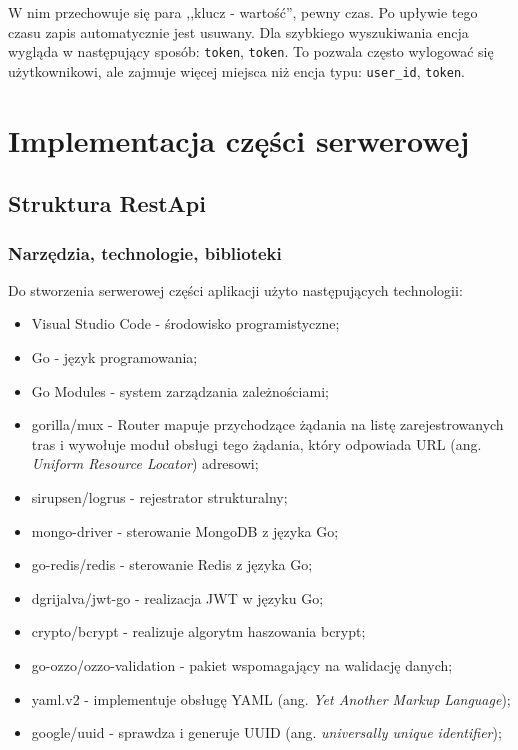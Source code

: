 W nim przechowuje się para ,,klucz - wartość'', pewny czas. Po upływie tego czasu zapis automatycznie jest usuwany.
Dla szybkiego wyszukiwania encja wygląda w następujący sposób: \texttt{token}, \texttt{token}. To pozwala często wylogować się użytkownikowi, ale zajmuje więcej miejsca niż encja typu: \texttt{user\_id}, \texttt{token}.

\section{Implementacja części serwerowej}
% 
\subsection{Struktura RestApi}
% 
\subsubsection{Narzędzia, technologie, biblioteki}
Do stworzenia serwerowej części aplikacji użyto następujących technologii:
\begin{itemize}
\item Visual Studio Code - środowisko programistyczne;
\item Go - język programowania;
\item Go Modules - system zarządzania zależnościami;
\item gorilla/mux - Router mapuje przychodzące żądania na listę zarejestrowanych tras i wywołuje moduł obsługi tego żądania, który odpowiada URL (ang. \textit{Uniform Resource Locator}) adresowi;
\item sirupsen/logrus - rejestrator strukturalny;
\item mongo-driver - sterowanie MongoDB z języka Go;
\item go-redis/redis - sterowanie Redis z języka Go;
\item dgrijalva/jwt-go - realizacja JWT w języku Go;
\item crypto/bcrypt - realizuje algorytm haszowania bcrypt;
\item go-ozzo/ozzo-validation - pakiet wspomagający na walidację danych;
\item yaml.v2 - implementuje obsługę YAML (ang. \textit{Yet Another Markup Language});
\item google/uuid - sprawdza i generuje UUID (ang. \textit{universally unique identifier});
\end{itemize}

% 
